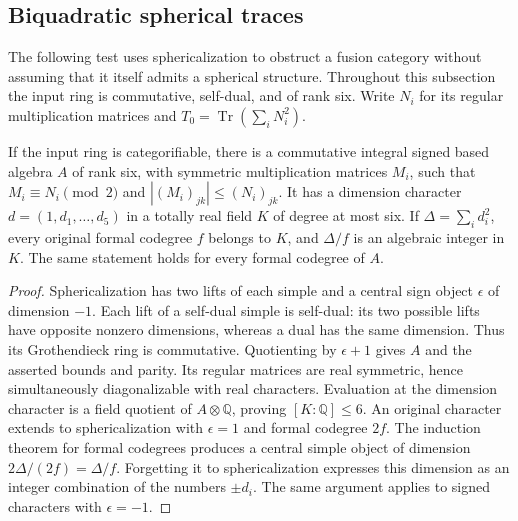\subsection{Biquadratic spherical traces}
\label{subsec:biquadratic-spherical-traces}
The following test uses sphericalization to obstruct a fusion category without
assuming that it itself admits a spherical structure.  Throughout this
subsection the input ring is commutative, self-dual, and of rank six.
Write $N_i$ for its regular multiplication matrices and
$T_0=\operatorname{Tr}(\sum_i N_i^2)$.

\begin{lemma}\label{lem:dimension-field-containment}
If the input ring is categorifiable, there is a commutative integral signed
based algebra $A$ of rank six, with symmetric multiplication matrices $M_i$,
such that $M_i\equiv N_i\pmod2$ and $|(M_i)_{jk}|\le (N_i)_{jk}$.
It has a dimension character $d=(1,d_1,\ldots,d_5)$ in a totally real field
$K$ of degree at most six.  If $\Delta=\sum_i d_i^2$, every original formal
codegree $f$ belongs to $K$, and $\Delta/f$ is an algebraic integer in $K$.
The same statement holds for every formal codegree of $A$.
\end{lemma}
\begin{proof}
Sphericalization has two lifts of each simple and a central sign object
$\epsilon$ of dimension $-1$.  Each lift of a self-dual simple is self-dual:
its two possible lifts have opposite nonzero dimensions, whereas a dual has
the same dimension.  Thus its Grothendieck ring is commutative.  Quotienting
by $\epsilon+1$ gives $A$ and the asserted bounds and parity.  Its regular
matrices are real symmetric, hence simultaneously diagonalizable with real
characters.  Evaluation at the dimension character is a field quotient
of $A\otimes\mathbb Q$, proving $[K:\mathbb Q]\le6$.
An original character extends to sphericalization with $\epsilon=1$ and
formal codegree $2f$.  The induction theorem for formal codegrees
\cite[Theorem~2.13]{Ostrik3} produces a central simple object of dimension
$2\Delta/(2f)=\Delta/f$.  Forgetting it to sphericalization expresses this
dimension as an integer combination of the numbers $\pm d_i$.
The same argument applies to signed characters with $\epsilon=-1$.
\end{proof}

